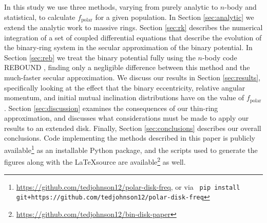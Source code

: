 \documentclass[twocolumn]{aastex631}
\newcommand\ghurl[0]{\url{https://github.com/tedjohnson12/bin-disk-paper}}
\newcommand\codeurl[0]{https://github.com/tedjohnson12/polar-disk-freq}
\begin{document}
In this study we use three methods, varying from purely analytic to $n$-body and statistical, to calculate $f_\text{polar}$ for a given population. In Section \ref{sec:analytic} we extend the analytic work to massive rings. Section \ref{sec:rk} 
describes the numerical integration of a set of coupled differential equations that describe the evolution of the binary-ring system in the secular approximation of the binary potential. In Section \ref{sec:reb} we treat the binary potential fully using the $n$-body code {\sc REBOUND} \citep{rebound}, finding only a negligible difference between this method and the much-faster secular approximation. We discuss our results in Section \ref{sec:results}, specifically looking at the effect that the binary eccentricity, relative angular momentum, and initial mutual inclination distributions have on the value of $f_\text{polar}$. Section \ref{sec:discussion} examines the consequences of our thin-ring approximation, and discusses what considerations must be made to apply our results to an extended disk. Finally, Section \ref{sec:conclusions} describes our overall conclusions. Code implementing the methods described in this paper is publicly available\footnote{\url{\codeurl}, or via \hfill \break \texttt{ pip install git+\codeurl} } as an installable Python package, and the scripts used to generate the figures along with the \LaTeX \space source are available\footnote{\ghurl} as well.
\end{document}
